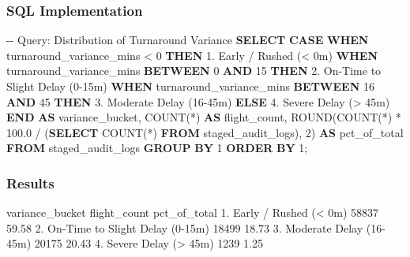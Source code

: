 \documentclass[
  letterpaper,
  DIV=11,
  numbers=noendperiod]{scrartcl}
\newenvironment{Shaded}{\begin{snugshade}}{\end{snugshade}}
\newcommand{\CommentTok}[1]{\textcolor[rgb]{0.37,0.37,0.37}{#1}}
\newcommand{\ControlFlowTok}[1]{\textcolor[rgb]{0.00,0.23,0.31}{\textbf{#1}}}
\newcommand{\DecValTok}[1]{\textcolor[rgb]{0.68,0.00,0.00}{#1}}
\newcommand{\FloatTok}[1]{\textcolor[rgb]{0.68,0.00,0.00}{#1}}
\newcommand{\FunctionTok}[1]{\textcolor[rgb]{0.28,0.35,0.67}{#1}}
\newcommand{\KeywordTok}[1]{\textcolor[rgb]{0.00,0.23,0.31}{\textbf{#1}}}
\newcommand{\NormalTok}[1]{\textcolor[rgb]{0.00,0.23,0.31}{#1}}
\newcommand{\OperatorTok}[1]{\textcolor[rgb]{0.37,0.37,0.37}{#1}}
\newcommand{\StringTok}[1]{\textcolor[rgb]{0.13,0.47,0.30}{#1}}
\begin{document}
\subsubsection{SQL Implementation}

\begin{Shaded}
\begin{Highlighting}[]
\CommentTok{{-}{-} Query: Distribution of Turnaround Variance}
\KeywordTok{SELECT} 
    \ControlFlowTok{CASE} 
        \ControlFlowTok{WHEN}\NormalTok{ turnaround\_variance\_mins }\OperatorTok{\textless{}} \DecValTok{0} \ControlFlowTok{THEN} \StringTok{\textquotesingle{}1. Early / Rushed (\textless{} 0m)\textquotesingle{}}
        \ControlFlowTok{WHEN}\NormalTok{ turnaround\_variance\_mins }\KeywordTok{BETWEEN} \DecValTok{0} \KeywordTok{AND} \DecValTok{15} \ControlFlowTok{THEN} \StringTok{\textquotesingle{}2. On{-}Time to Slight Delay (0{-}15m)\textquotesingle{}}
        \ControlFlowTok{WHEN}\NormalTok{ turnaround\_variance\_mins }\KeywordTok{BETWEEN} \DecValTok{16} \KeywordTok{AND} \DecValTok{45} \ControlFlowTok{THEN} \StringTok{\textquotesingle{}3. Moderate Delay (16{-}45m)\textquotesingle{}}
        \ControlFlowTok{ELSE} \StringTok{\textquotesingle{}4. Severe Delay (\textgreater{} 45m)\textquotesingle{}}
    \ControlFlowTok{END} \KeywordTok{AS}\NormalTok{ variance\_bucket,}
    \FunctionTok{COUNT}\NormalTok{(}\OperatorTok{*}\NormalTok{) }\KeywordTok{AS}\NormalTok{ flight\_count,}
    \FunctionTok{ROUND}\NormalTok{(}\FunctionTok{COUNT}\NormalTok{(}\OperatorTok{*}\NormalTok{) }\OperatorTok{*} \FloatTok{100.0} \OperatorTok{/}\NormalTok{ (}\KeywordTok{SELECT} \FunctionTok{COUNT}\NormalTok{(}\OperatorTok{*}\NormalTok{) }\KeywordTok{FROM}\NormalTok{ staged\_audit\_logs), }\DecValTok{2}\NormalTok{) }\KeywordTok{AS}\NormalTok{ pct\_of\_total}
\KeywordTok{FROM}\NormalTok{ staged\_audit\_logs}
\KeywordTok{GROUP} \KeywordTok{BY} \DecValTok{1}
\KeywordTok{ORDER} \KeywordTok{BY} \DecValTok{1}\NormalTok{;}
\end{Highlighting}
\end{Shaded}

\subsubsection{Results}

variance\_bucket flight\_count pct\_of\_total 1. Early / Rushed
(\textless{} 0m) 58837 59.58 2. On-Time to Slight Delay (0-15m) 18499
18.73 3. Moderate Delay (16-45m) 20175 20.43 4. Severe Delay
(\textgreater{} 45m) 1239 1.25
\end{document}
